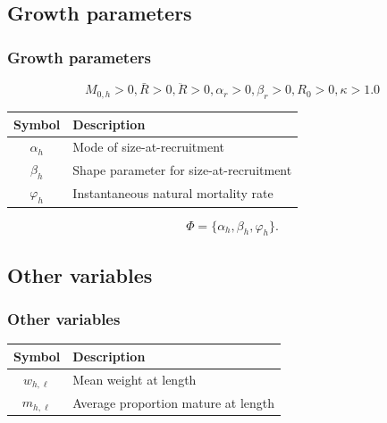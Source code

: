 \documentclass{beamer}
\begin{document}

\subsection{Growth parameters}
\begin{frame}
\frametitle{Growth parameters}

\begin{equation*}
  M_{0,h} > 0, \bar{R} > 0, \ddot{R} > 0, \alpha_r > 0, \beta_r > 0, R_0 > 0, \kappa
  > 1.0
\end{equation*}

\begin{table}
  \centering
  \begin{tabular}{cl}
  \hline
  Symbol  & Description \\
  \hline
      $\alpha_h$  & Mode of size-at-recruitment\\
      $\beta_h$   & Shape parameter for size-at-recruitment\\
      $\varphi_h$ & Instantaneous natural mortality rate\\
  \hline
  \end{tabular}
\end{table}

\begin{equation*}
  \Phi = \{ \alpha_h, \beta_h, \varphi_h \}.
\end{equation*}

\end{frame}


\subsection{Other variables}
\begin{frame}
\frametitle{Other variables}

\begin{table}
  \centering
  \begin{tabular}{cl}
  \hline
  Symbol  & Description \\
  \hline
      $w_{h,\ell}$  & Mean weight at length\\
      $m_{h,\ell} $ & Average proportion mature at length\\
  \hline
  \end{tabular}
\end{table}

\end{frame}
\end{document}
